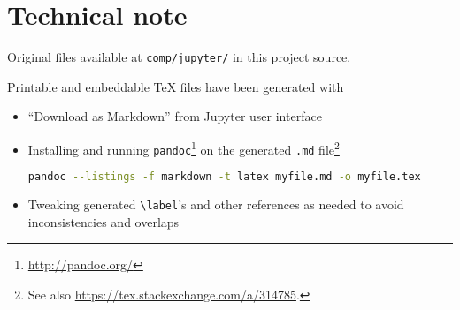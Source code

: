 \section*{Technical note}

Original files available at \verb#comp/jupyter/# in this project source.

Printable and embeddable \TeX{} files have been generated with
\begin{itemize}
  \item
    ``Download as Markdown'' from Jupyter user interface
  \item
    Installing and running \verb#pandoc#\footnote{ \url{http://pandoc.org/}}
    on the generated \verb#.md# file\footnote{ See also \url{https://tex.stackexchange.com/a/314785}.}
    \begin{lstlisting}[language=Bash]
      pandoc --listings -f markdown -t latex myfile.md -o myfile.tex
    \end{lstlisting}
  \item
    Tweaking generated \verb#\label#'s and other references as needed to avoid inconsistencies and overlaps
\end{itemize}
